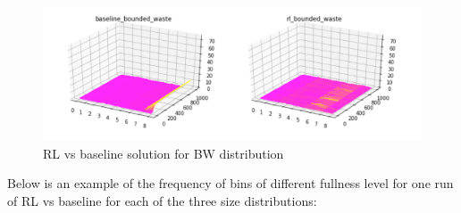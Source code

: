 \documentclass{article}
\begin{document}
\begin{figure}[h!]
	\centering
	\includegraphics[width=1\linewidth]{images/bounded_waste_sol.png}
	\caption{RL vs baseline solution for BW distribution}
	\label{fig:bin_packing_BW_dist}
\end{figure}

Below is an example of the frequency of bins of different fullness level for one run of RL vs baseline for each of the three size distributions:
\end{document}

